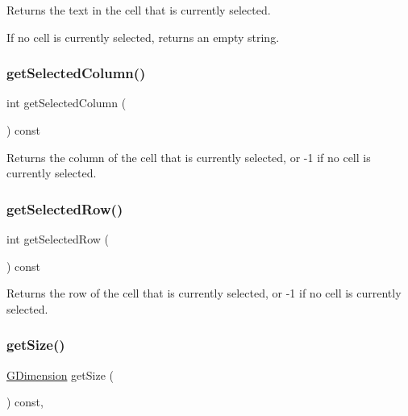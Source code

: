 Returns the text in the cell that is currently selected. 

If no cell is currently selected, returns an empty string. \mbox{\label{classGTable_abeec6fda3c331aa187ba1b695b19d435}} 
\subsubsection{\texorpdfstring{get\+Selected\+Column()}{getSelectedColumn()}}
{\footnotesize\ttfamily int get\+Selected\+Column (\begin{DoxyParamCaption}{ }\end{DoxyParamCaption}) const\hspace{0.3cm}{\ttfamily [virtual]}}



Returns the column of the cell that is currently selected, or -\/1 if no cell is currently selected. 

\mbox{\label{classGTable_adeb0b39683825191a8216d6cc3ca5072}} 
\subsubsection{\texorpdfstring{get\+Selected\+Row()}{getSelectedRow()}}
{\footnotesize\ttfamily int get\+Selected\+Row (\begin{DoxyParamCaption}{ }\end{DoxyParamCaption}) const\hspace{0.3cm}{\ttfamily [virtual]}}



Returns the row of the cell that is currently selected, or -\/1 if no cell is currently selected. 

\mbox{\label{classGInteractor_a7b4eec96a2bdc6420695d5796a78eea9}} 
\subsubsection{\texorpdfstring{get\+Size()}{getSize()}}
{\footnotesize\ttfamily \mbox{\hyperlink{classGDimension}{G\+Dimension}} get\+Size (\begin{DoxyParamCaption}{ }\end{DoxyParamCaption}) const\hspace{0.3cm}{\ttfamily [virtual]}, {\ttfamily [inherited]}}



